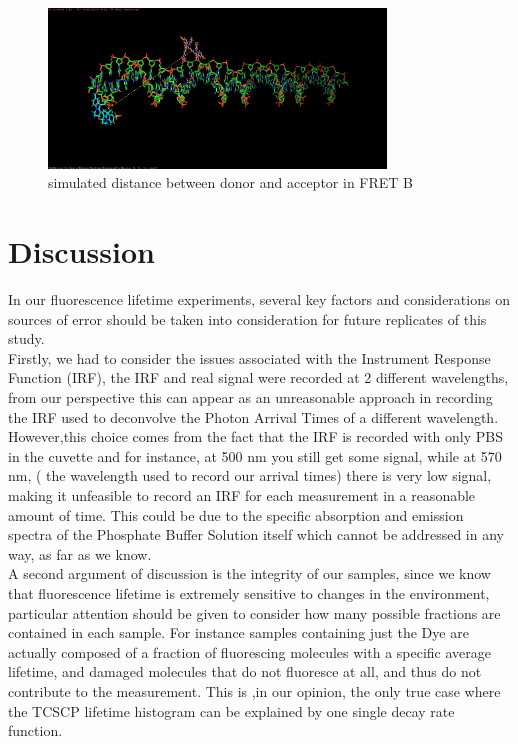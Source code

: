 \documentclass[a4paper,english,12pt,bibliography=totoc]{scrreprt}
\begin{document}
\begin{figure}
    \centering
    \includegraphics[width=0.8\textwidth]{images/other/DistanceFretB.png}
    \caption{simulated distance between donor and acceptor in FRET B}
    \label{Cy3_data1_fit1}
\end{figure}

\section{Discussion}
\label{sec:Discussion} 
In our fluorescence lifetime experiments, several key factors and considerations on sources of error should be taken into consideration for future replicates of this study. 
\\
Firstly, we had to consider the issues associated with the  Instrument Response Function (IRF), the IRF and real signal were recorded at 2 different wavelengths, from our perspective this can appear as an unreasonable approach in recording the IRF used to deconvolve the Photon Arrival Times of a different wavelength. However,this choice comes from the fact that the IRF is recorded with only PBS in the cuvette and for instance, at 500 nm you still get some signal, while at 570 nm, ( the wavelength used to record our arrival times) there is very low signal, making it unfeasible to record an IRF for each measurement in a reasonable amount of time. This could be due to the specific absorption and emission spectra of the Phosphate Buffer Solution itself which cannot be addressed in any way, as far as we know.\\
 
A second argument of discussion is the integrity of our samples, since we know that fluorescence lifetime is extremely sensitive to changes in the environment, particular attention should be given to consider how many possible fractions are contained in each sample. For instance samples containing just the Dye are actually composed of a fraction of fluorescing molecules with a specific average lifetime, and damaged molecules that do not fluoresce at all, and thus do not contribute to the measurement. This is ,in our opinion, the only true case where the TCSCP lifetime histogram can be explained by one single decay rate function. \\
\end{document}
